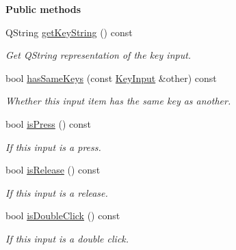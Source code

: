 \begin{Indent}\textbf{ Public methods}\par
\begin{DoxyCompactItemize}
\item 
\mbox{\label{structrev_1_1_key_input_ad75d03f51f923d59457ef7d1ad8ba0aa}} 
Q\+String \mbox{\hyperlink{structrev_1_1_key_input_ad75d03f51f923d59457ef7d1ad8ba0aa}{get\+Key\+String}} () const
\begin{DoxyCompactList}\small\item\em Get Q\+String representation of the key input. \end{DoxyCompactList}\item 
\mbox{\label{structrev_1_1_key_input_a75dbb6ab9793b170570e53b0b613b098}} 
bool \mbox{\hyperlink{structrev_1_1_key_input_a75dbb6ab9793b170570e53b0b613b098}{has\+Same\+Keys}} (const \mbox{\hyperlink{structrev_1_1_key_input}{Key\+Input}} \&other) const
\begin{DoxyCompactList}\small\item\em Whether this input item has the same key as another. \end{DoxyCompactList}\item 
\mbox{\label{structrev_1_1_key_input_ada2f0cb1e32465ef18d917966d97d7a3}} 
bool \mbox{\hyperlink{structrev_1_1_key_input_ada2f0cb1e32465ef18d917966d97d7a3}{is\+Press}} () const
\begin{DoxyCompactList}\small\item\em If this input is a press. \end{DoxyCompactList}\item 
\mbox{\label{structrev_1_1_key_input_a79bcea5d74d7232eb8fd8f621f287f8d}} 
bool \mbox{\hyperlink{structrev_1_1_key_input_a79bcea5d74d7232eb8fd8f621f287f8d}{is\+Release}} () const
\begin{DoxyCompactList}\small\item\em If this input is a release. \end{DoxyCompactList}\item 
\mbox{\label{structrev_1_1_key_input_afa387e7a782937416f171aeb30597158}} 
bool \mbox{\hyperlink{structrev_1_1_key_input_afa387e7a782937416f171aeb30597158}{is\+Double\+Click}} () const
\begin{DoxyCompactList}\small\item\em If this input is a double click. \end{DoxyCompactList}\end{DoxyCompactItemize}
\end{Indent}
